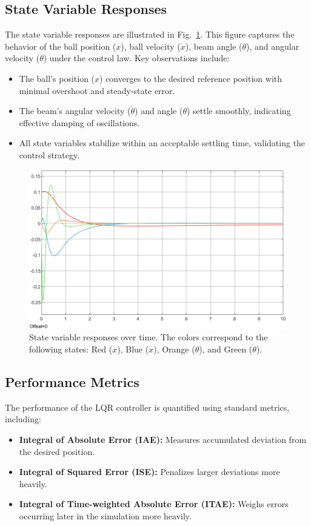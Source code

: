 \documentclass[conference]{IEEEtran}
\begin{document}
\subsection{State Variable Responses}
The state variable responses are illustrated in Fig.~\ref{fig:states_scope}. This figure captures the behavior of the ball position (\(x\)), ball velocity (\(\dot{x}\)), beam angle (\(\theta\)), and angular velocity (\(\dot{\theta}\)) under the control law. Key observations include:

\begin{itemize}
    \item The ball's position (\(x\)) converges to the desired reference position with minimal overshoot and steady-state error.
    \item The beam's angular velocity (\(\dot{\theta}\)) and angle (\(\theta\)) settle smoothly, indicating effective damping of oscillations.
    \item All state variables stabilize within an acceptable settling time, validating the control strategy.
\end{itemize}

\begin{figure}[H]
    \centering
    \includegraphics[width=\linewidth]{figures/states_scope.png}
    \caption[]{State variable responses over time. The colors correspond to the following states: Red (\(x\)), Blue (\(\dot{x}\)), Orange (\(\theta\)), and Green (\(\dot{\theta}\)).}
    \label{fig:states_scope}
\end{figure}


\subsection{Performance Metrics}
The performance of the LQR controller is quantified using standard metrics, including:
\begin{itemize}
    \item \textbf{Integral of Absolute Error (IAE):} Measures accumulated deviation from the desired position.
    \item \textbf{Integral of Squared Error (ISE):} Penalizes larger deviations more heavily.
    \item \textbf{Integral of Time-weighted Absolute Error (ITAE):} Weighs errors occurring later in the simulation more heavily.
\end{itemize}
\end{document}
